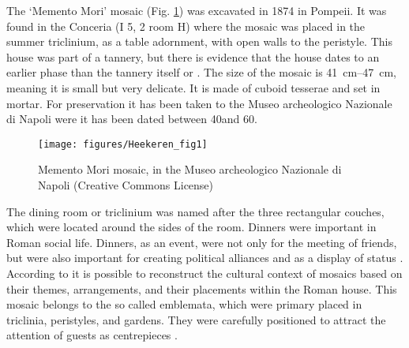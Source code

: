 	The ‘Memento Mori’ mosaic (Fig. \ref {fig:heekeren_fig1}) was excavated in 1874 in Pompeii. It was found in the Conceria (I 5, 2 room H) where the mosaic was placed in the summer triclinium, as a table adornment, with open walls to the peristyle. This house was part of a tannery, but there is evidence that the house dates to an earlier phase than the tannery itself \parencite[185]{Baldassarreal_1990} or \parencite[273]{Mau_1874}. The size of the mosaic is \SIrange{41}{47}{\centi\meter}, meaning it is small but very delicate. 
It is made of cuboid tesserae and set in mortar. For preservation it has been taken to the Museo archeologico Nazionale di Napoli were it has been dated between 40\AD and 60\AD  \parencite[9]{Sogliano_1874}.
\begin{figure}[!p]
\centering
\texttt{[image: figures/Heekeren\_fig1]}
\caption{Memento Mori mosaic, in the Museo archeologico Nazionale di Napoli (Creative Commons License)}
\label{fig:heekeren_fig1}
\end{figure}
	The dining room or triclinium was named after the three rectangular couches, which were located around the sides of the room. Dinners were important in Roman social life. Dinners, as an event, were not only for the meeting of friends, but were also important for creating political alliances and as a display of status \parencite [119] {Ellis_1991}. According to \textcite [105--106] {Kondoleon_1991} it is possible to reconstruct the cultural context of mosaics based on their themes, arrangements, and their placements within the Roman house. This mosaic belongs to the so called emblemata, which were primary placed in triclinia, peristyles, and gardens. 
They were carefully positioned to attract the attention of guests as centrepieces \parencite [97] {Stewart_2004}.

